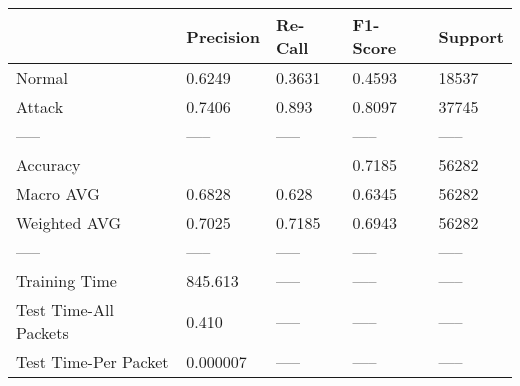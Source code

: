 \begin{tabular}{lllll}
\toprule
{} & Precision & Re-Call & F1-Score & Support \\
\midrule
Normal                &    0.6249 &  0.3631 &   0.4593 &   18537 \\
Attack                &    0.7406 &   0.893 &   0.8097 &   37745 \\
-----                 &     ----- &   ----- &    ----- &   ----- \\
Accuracy              &           &         &   0.7185 &   56282 \\
Macro AVG             &    0.6828 &   0.628 &   0.6345 &   56282 \\
Weighted AVG          &    0.7025 &  0.7185 &   0.6943 &   56282 \\
-----                 &     ----- &   ----- &    ----- &   ----- \\
Training Time         &   845.613 &   ----- &    ----- &   ----- \\
Test Time-All Packets &     0.410 &   ----- &    ----- &   ----- \\
Test Time-Per Packet  &  0.000007 &   ----- &    ----- &   ----- \\
\bottomrule
\end{tabular}

